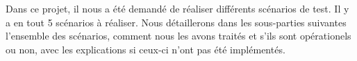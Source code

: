 
Dans ce projet, il nous a été demandé de réaliser différents scénarios de test.
Il y a en tout 5 scénarios à réaliser.
Nous détaillerons dans les sous-parties suivantes l'ensemble des scénarios, comment nous les avons traités et s'ils sont opérationels ou non, avec les explications si ceux-ci n'ont pas été implémentés.
